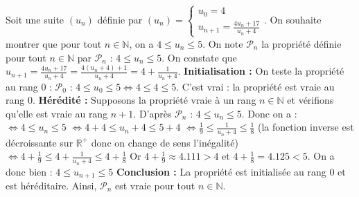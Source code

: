 	\begin{tip}[Exemple]
		Soit une suite $(u_n)$ définie par $(u_n) = \begin{cases} u_0 = 4\\ u_{n+1} = \frac{4u_n + 17}{u_n + 4}\end{cases}$. On souhaite montrer que pour tout $n \in \mathbb{N}$, on a $4 \leq u_n \leq 5$.
		\newpar
		On note $\mathcal{P}_n$ la propriété définie pour tout $n \in \mathbb{N}$ par $\mathcal{P}_n$ : $4 \leq u_n \leq 5$.
		\newpar
		On constate que $u_{n+1} = \frac{4u_n + 17}{u_n + 4} = \frac{4(u_n + 4) + 1}{u_n + 4} = 4 + \frac{1}{u_n + 4}$.
		\newpar
		\textbf{Initialisation :} On teste la propriété au rang $0$ :
		\newpar
		$\mathcal{P}_0$ : $4 \leq u_0 \leq 5 \iff 4 \leq 4 \leq 5$. C'est vrai : la propriété est vraie au rang $0$.
		\newpar
		\textbf{Hérédité :} Supposons la propriété vraie à un rang $n \in \mathbb{N}$ et vérifions qu'elle est vraie au rang $n+1$.
		\newpar
		D'après $\mathcal{P}_n$ : $4 \leq u_n \leq 5$. Donc on a :
		\newpar
		$\iff 4 \leq u_n \leq 5$
		\newpar
		$\iff 4 + 4 \leq u_n + 4 \leq 5 + 4$
		\newpar
		$\iff \frac{1}{9} \leq \frac{1}{u_n + 4} \leq \frac{1}{8}$ (la fonction inverse est décroissante sur $\mathbb{R}^+$ donc on change de sens l'inégalité)
		\newpar
		$\iff 4 + \frac{1}{9} \leq 4 + \frac{1}{u_n + 4} \leq 4 + \frac{1}{8}$
		\newpar
		Or $4 + \frac{1}{9} \approx 4.111 > 4$ et $4 + \frac{1}{8} = 4.125 < 5$. On a donc bien :
		\newpar
		$4 \leq u_{n+1} \leq 5$
		\newpar
		\textbf{Conclusion :} La propriété est initialisée au rang $0$ et est héréditaire. Ainsi, $\mathcal{P}_n$ est vraie pour tout $n \in \mathbb{N}$.
	\end{tip}
	

